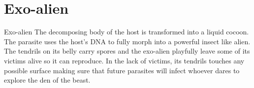 \section{Exo-alien}


\begin{rpg-commentbox}{Exo-alien}
    The decomposing body of the host is transformed into a liquid cocoon. The parasite uses the host's DNA to fully morph into a powerful insect like alien.  The tendrils on its belly carry spores and the exo-alien playfully leave some of its victims alive so it can reproduce. In the lack of victims, its tendrils touches any possible surface making sure that future parasites will infect whoever dares to explore the den of the beast.

\end{rpg-commentbox}    



